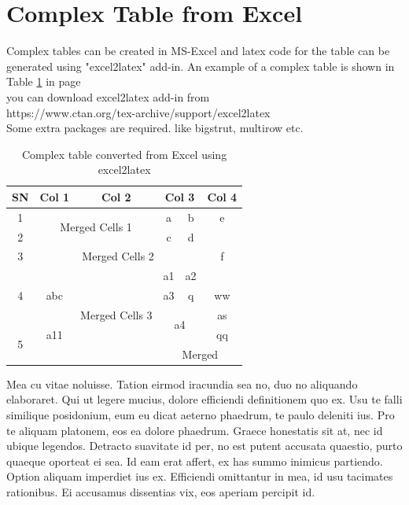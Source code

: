 \section{Complex Table from Excel}
Complex tables can be created in MS-Excel and latex code for the table can be generated using "excel2latex" add-in.  An example of a complex table is shown in Table \ref{tab:complexTable} in page \pageref{tab:complexTable}\\ you can download excel2latex add-in from\\ 
https://www.ctan.org/tex-archive/support/excel2latex\\
Some extra packages are required. like bigstrut, multirow etc.
\begin{table}[htbp]
  \centering
  \caption{Complex table converted from Excel using excel2latex}
    \begin{tabular}{|c|c|c|c|c|c|}
    \hline
    SN    & Col 1 & Col 2 & \multicolumn{2}{c|}{Col 3} & Col 4 \bigstrut\\
    \hline
    1     & \multicolumn{2}{c|}{\multirow{2}[4]{*}{Merged Cells 1}} & a     & b     & e \bigstrut\\
\cline{1-1}\cline{4-6}    2     & \multicolumn{2}{c|}{} & c     & d     & \multirow{3}[6]{*}{f} \bigstrut\\
\cline{1-5}    3     & \multicolumn{4}{c|}{Merged Cells 2} &  \bigstrut\\
\cline{1-5}    \multirow{3}[6]{*}{4} & \multirow{3}[6]{*}{abc} & \multirow{5}[10]{*}{Merged Cells 3} & a1    & a2    &  \bigstrut\\
\cline{4-6}          &       &       & a3    & q     & ww \bigstrut\\
\cline{4-6}          &       &       & \multicolumn{2}{c|}{\multirow{2}[4]{*}{a4}} & as \bigstrut\\
\cline{1-2}\cline{6-6}    \multirow{2}[4]{*}{5} & a11   &       & \multicolumn{2}{c|}{} & qq \bigstrut\\
\cline{2-2}\cline{4-6}          &       &       & \multicolumn{3}{c|}{Merged} \bigstrut\\
    \hline
    \end{tabular}%
  \label{tab:complexTable}%
\end{table}%
Mea cu vitae noluisse. Tation eirmod iracundia sea no, duo no aliquando elaboraret. Qui ut legere mucius, dolore efficiendi definitionem quo ex. Usu te falli similique posidonium, eum eu dicat aeterno phaedrum, te paulo deleniti ius. Pro te aliquam platonem, eos ea dolore phaedrum. Graece honestatis sit at, nec id ubique legendos.
Detracto suavitate id per, no est putent accusata quaestio, purto quaeque oporteat ei sea. Id eam erat affert, ex has summo inimicus partiendo. Option aliquam imperdiet ius ex. Efficiendi omittantur in mea, id usu tacimates rationibus. Ei accusamus dissentias vix, eos aperiam percipit id.

